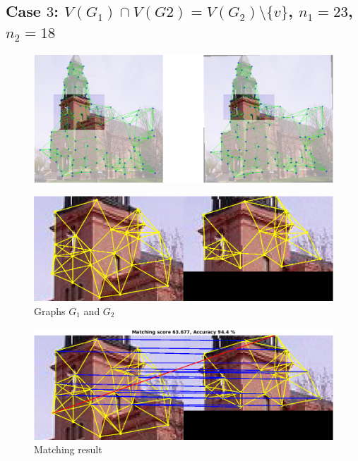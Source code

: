 \documentclass[
	fontsize=12pt,
	paper=a4,
	twoside=false,
	numbers=noenddot,
	plainheadsepline,
	toc=listof,
	toc=bibliography
]{scrartcl}
\begin{document}
\subsection*{ Case $3$: $V(G_1)\cap V(G2) = V(G_2)\setminus\{v\}$, $n_1=23$, $n_2=18$}
\begin{figure} [htb] \centering
	\includegraphics[scale = 0.35]{test3/subregions.png}
\end{figure}
\begin{figure} [hb] \centering
	\includegraphics[scale = 0.4]{test3/subgraphs.png}
	\caption{Graphs $G_1$ and $G_2$}
\end{figure}
\begin{figure} [htb] \centering
	\includegraphics[scale = 0.4]{test3/matching_result.png}
	\caption{ Matching result}
\end{figure}

\FloatBarrier

\newpage
\end{document}
